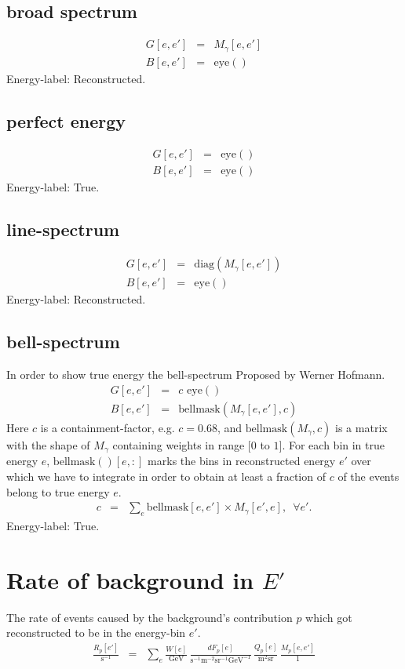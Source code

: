 \documentclass{article}%
\begin{document}
\subsection{broad spectrum}
\begin{eqnarray}
G[e, e'] &=& M_{\gamma}[e, e']
\\
B[e, e'] &=& \mathrm{eye}()
\end{eqnarray}
%
Energy-label: Reconstructed.
%
\subsection{perfect energy}
\begin{eqnarray}
G[e, e'] &=& \mathrm{eye}()
\\
B[e, e'] &=& \mathrm{eye}()
\end{eqnarray}
%
Energy-label: True.
%
\subsection{line-spectrum}
\begin{eqnarray}
G[e, e'] &=& \mathrm{diag}(M_{\gamma}[e, e'])
\\
B[e, e'] &=& \mathrm{eye}()
\end{eqnarray}
%
Energy-label: Reconstructed.
%
\subsection{bell-spectrum}
%
In order to show true energy the bell-spectrum
%
Proposed by Werner Hofmann.
\begin{eqnarray}
G[e, e'] &=& c \, \, \mathrm{eye}()
\\
B[e, e'] &=& \mathrm{bellmask}(M_{\gamma}[e, e'], c)
\end{eqnarray}
%
Here $c$ is a containment-factor, e.g. $c = 0.68$,
%
and $\mathrm{bellmask}(M_{\gamma}, c)$ is a matrix with the shape of $M_{\gamma}$ containing weights in range $[0$ to $1]$.
%
For each bin in true energy $e$, $\mathrm{bellmask}()[e, :]$ marks the bins in reconstructed energy $e'$ over which we have to integrate in order to obtain at least a fraction of $c$ of the events belong to true energy $e$.
%
\begin{eqnarray}
c &=& \sum_e \mathrm{bellmask}[e ,e'] \times M_{\gamma}[e', e], \, \, \, \forall e'.
\end{eqnarray}
%
Energy-label: True.
%
\section{Rate of background in $E'$}
%
The rate of events caused by the background's contribution $p$ which got reconstructed to be in the energy-bin $e'$.
%
\begin{eqnarray}
\frac{R_p[e']}{\text{s}^{-1}}
&=&
\sum_{e}
\frac{W[e]}{\text{GeV}} \,
\frac{dF_p[e]}{\text{s}^{-1}\text{m}^{-2}\text{sr}^{-1}\text{GeV}^{-1}} \,
\frac{Q_p[e]}{\text{m}^2\text{sr}} \,
\frac{M_p[e, e']}{1}
\end{eqnarray}
%
\end{document}
